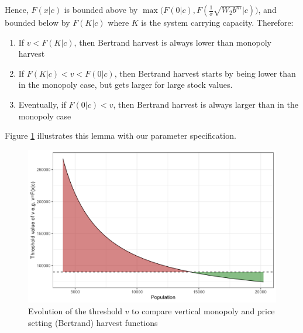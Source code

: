 Hence, $F(x|c)$ is bounded above by $\max \big(F(0|c),F(\frac{1}{\sigma}\sqrt{W_2 b^m}|c)\big)$, and bounded below by $F(K|c)$ where $K$ is the system carrying capacity. Therefore:
\begin{enumerate}
    \item If $v<F(K|c)$, then Bertrand harvest is always lower than monopoly harvest
    \item If $F(K|c)<v<F(0|c)$, then Bertrand harvest starts by being lower than in the monopoly case, but gets larger for large stock values. 
    \item Eventually, if $F(0|c)<v$, then Bertrand harvest is always larger than in the monopoly case
\end{enumerate}
Figure \ref{fig:lemma2} illustrates this lemma with our parameter specification.
\begin{figure}[h]
    \centering
    \includegraphics[width=0.8\linewidth]{figures/totoaba/lemma2_bertrand.png}
    \caption{Evolution of the threshold $v$ to compare vertical monopoly and price setting (Bertrand) harvest functions}
    \label{fig:lemma2}
\end{figure}


